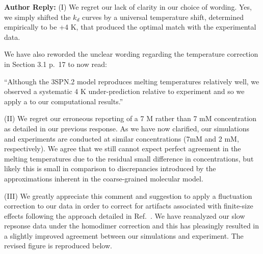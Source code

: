 \documentclass[11pt,a4paper]{letter} %
\newcommand*{\rood}[1]{{\color{red}{#1}}}
\begin{document}
\textbf{Author Reply:}   (I) We regret our lack of clarity in our choice of wording. Yes, we simply shifted the $k_d$ curves by a universal temperature shift, determined empirically to be +4 K, that produced the optimal match with the experimental data. 

We have also reworded the unclear wording regarding the temperature correction in Section 3.1 p.~17 to now read:

``Although the 3SPN.2 model reproduces melting temperatures relatively well, we observed a systematic 4 K under-prediction relative to experiment and so we apply a \rood{universal (+4) K corrective temperature shift} to our computational results.''

(II) We regret our erroneous reporting of a 7 M rather than 7 mM concentration as detailed in our previous response. As we have now clarified, our simulations and experiments are conducted at similar concentrations (7mM and 2 mM, respectively). We agree that we still cannot expect perfect agreement in the melting temperatures due to the residual small  difference in concentrations, but likely this is small in comparison to discrepancies introduced by the approximations inherent in the coarse-grained molecular model.

(III) We greatly appreciate this comment and suggestion to apply a fluctuation correction to our data in order to correct for artifacts associated with finite-size effects following the approach detailed in Ref.~\citep{Ouldridge2010ExtractingSimulations}. We have reanalyzed our slow repsonse data under the homodimer correction and this has pleasingly resulted in a slightly improved agreement between our simulations and experiment. The revised figure is reproduced below. 
\end{document}
